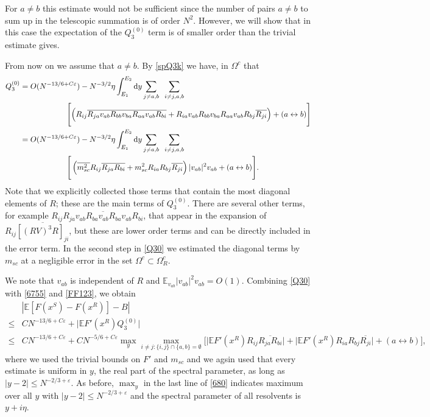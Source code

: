\documentclass[draft]{article}
\newcommand{\e}{\varepsilon}
\newcommand{\rd}{{\rm d}}
\newcommand{\non}{\nonumber}
\newcommand{\ov}{\overline}
\newcommand{\E}{{\mathbb E }}
\numberwithin{equation}{section}
\numberwithin{theorem}{section}
\numberwithin{definition}{section}
\numberwithin{remark}{section}
\begin{document}
For $a\ne b$ this estimate would not be sufficient since
the number of pairs $a\ne b$ to sum up
in the telescopic summation is of order $N^2$.
However, we will show that in this case the expectation of the $Q_3^{(0)}$ term 
is of smaller order  than the trivial estimate gives.


From now on we assume that $a\ne b$.
By \eqref{spQ3k} we have, in $\Omega^c$ that
\begin{align}\label{Q30}
Q_3^{(0)}  &=O(N^{-13/6+C\e})-N^{-3/2}\eta  \int_{E_1}^{E_2} \rd y \sum_{j\neq a,b}
\;\; \sum_{i\neq j,a,b}  \non \\  &
\qquad \qquad \qquad
\Bigg[\Big(R_{ij}\overline{R_{ja}v_{ab}R_{bb}v_{ba}R_{aa}v_{ab}R_{bi}}  
 +R_{ia}v_{ab}R_{bb}v_{ba}R_{aa}v_{ab}R_{bj}\overline{R_{ji}}\Big)
+(a\leftrightarrow b)\Bigg] \non
\\ \non
&=O(N^{-13/6+C\e})-  N^{-3/2} \eta  \int_{E_1}^{E_2} \rd y   \sum_{j\neq a,b} \;\; \sum_{i\neq j,a,b}
\\
& \qquad\qquad\qquad
\Bigg[\left( \overline{m^2_{sc}}R_{ij}\overline{R_{ja}R_{bi}}
+m^2_{sc}R_{ia}R_{bj}\overline{R_{ji}}\right)|v_{ab}|^2v_{ab}
+(a\leftrightarrow b)\Bigg].  
\end{align}
Note that we explicitly collected those terms that contain
the most diagonal elements of $R$; these
are the main terms of $Q_3^{(0)}$. There are several other terms,
for example $R_{ij}\ov{ R_{ja} v_{ab} R_{ba} v_{ab} R_{ba} v_{ab} R_{bi}}$,
that appear in the expansion of $R_{ij}\ov {[(RV)^3R]_{ji}}$, but these are lower
order terms and can be directly included in the error term.
In the second step in \eqref{Q30} we estimated the diagonal terms by $m_{sc}$
at a negligible error in the set $\Omega^c\subset\Omega_R^c$.
 

We note that  $v_{ab}$ is independent of $R$ and $\E_{v_{ab}}|v_{ab}|^2v_{ab}=O(1)$. 
Combining \eqref{Q30} with \eqref{6755} and \eqref{FF123}, we obtain 
\begin{align}\label{680}
&\left|\E  [ F(x^S)- F(x^R) ] 
-B \right|\\\nonumber
\leq& CN^{-13/6+C\e}+\big| \E F'(x^R)  Q_3^{(0)}\big| \\ \nonumber
\leq &CN^{-13/6+C\e}+CN^{-5/6+C\e}\max_y\max_{i\neq j:\{i,j\}\cap \{a,b\}=\emptyset}
\Big[
\big|\E F'(x^R)  R_{ij}\overline{R_{ja}R_{bi}}\big|
+\big| \E F'(x^R) R_{ia}R_{bj}\overline{R_{ji}}\big| +(a\leftrightarrow b)\Big],
\end{align}
where we used the trivial bounds on $F'$ and $m_{sc}$
and we agsin used that every estimate is uniform in $y$, the real
part of the spectral parameter, as long as $|y-2|\le N^{-2/3+\e}$.
As before, $\max_y$ in the last line of \eqref{680} indicates
maximum over all $y$ with $|y-2|\le N^{-2/3+\e}$ and the spectral
parameter of all resolvents is $y+i\eta$.
\end{document}
